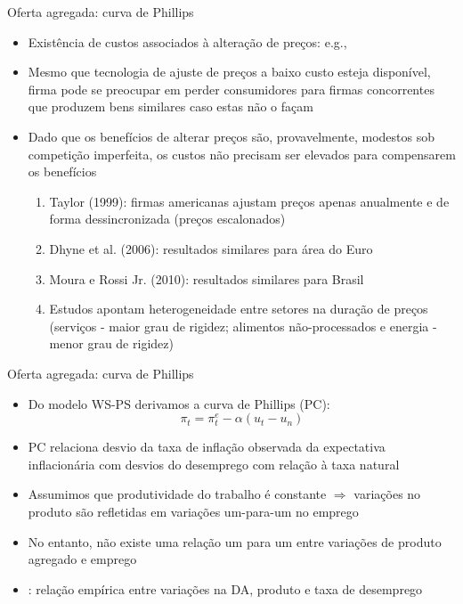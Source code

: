 \documentclass[10pt]{beamer}
\begin{document}
\begin{frame}
    {Oferta agregada: curva de Phillips}
    \begin{itemize}
        \item Existência de custos associados à alteração de preços: e.g., \bigskip
        \item Mesmo que tecnologia de ajuste de preços a baixo custo esteja disponível, firma pode se preocupar em perder consumidores para firmas concorrentes que produzem bens similares caso estas não o façam\bigskip
        \item Dado que os benefícios de alterar preços são, provavelmente, modestos sob competição imperfeita, os custos não precisam ser elevados para compensarem os benefícios\bigskip
        \begin{enumerate}
            \item Taylor (1999): firmas americanas ajustam preços apenas anualmente e de forma dessincronizada (preços escalonados)\medskip
            \item Dhyne et al. (2006): resultados similares para área do Euro\medskip
            \item Moura e Rossi Jr. (2010): resultados similares para Brasil\medskip
            \item Estudos apontam heterogeneidade entre setores na duração de preços (serviços - maior grau de rigidez; alimentos não-processados e energia - menor grau de rigidez)
        \end{enumerate} 
    \end{itemize}
\end{frame}

\begin{frame}
    {Oferta agregada: curva de Phillips}
    \begin{itemize}
        \item Do modelo WS-PS derivamos a curva de Phillips (PC):
        \begin{equation}
            \pi_t = \pi_t^e - \alpha(u_t - u_n)
        \end{equation}
        \item PC relaciona desvio da taxa de inflação observada da expectativa inflacionária com desvios do desemprego com relação à taxa natural\bigskip
        \item Assumimos que produtividade do trabalho é constante $\Rightarrow$ variações no produto são refletidas em variações um-para-um no emprego\bigskip
        \item No entanto, não existe uma relação um para um entre variações de produto agregado e emprego\bigskip
        \item {}: relação empírica entre variações na DA, produto e taxa de desemprego
    \end{itemize}
\end{frame}
\end{document}
